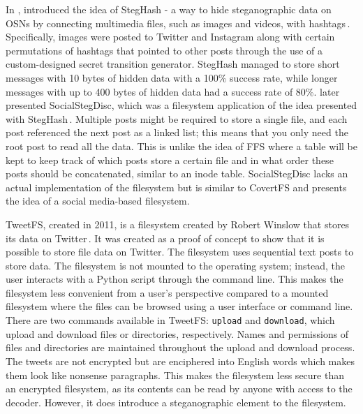 In \citeyear{szczypiorskiStegHashNewMethod2016}, \citeauthor{szczypiorskiStegHashNewMethod2016} introduced the idea of StegHash - a way to hide steganographic data on \glspl{OSN} by connecting multimedia files, such as images and videos, with hashtags\,\cite{szczypiorskiStegHashNewMethod2016}. Specifically, images were posted to Twitter and Instagram along with certain permutations of hashtags that pointed to other posts through the use of a \mbox{custom-designed} secret transition generator. StegHash managed to store short messages with 10 bytes of hidden data with a 100\% success rate, while longer messages with up to 400 bytes of hidden data had a success rate of 80\%. \citeauthor{bieniaszSocialStegDiscApplicationSteganography2017} later presented SocialStegDisc, which was a filesystem application of the idea presented with StegHash\,\cite{bieniaszSocialStegDiscApplicationSteganography2017}. Multiple posts might be required to store a single file, and each post referenced the next post as a linked list; this means that you only need the root post to read all the data. This is unlike the idea of \gls{FFS} where a table will be kept to keep track of which posts store a certain file and in what order these posts should be concatenated, similar to an inode table. SocialStegDisc lacks an actual implementation of the filesystem but is similar to CovertFS and presents the idea of a social \mbox{media-based} filesystem.

TweetFS, created in 2011, is a filesystem created by Robert Winslow that stores its data on Twitter\,\cite{winslowTweetfsTweetfsMaster}. It was created as a proof of concept to show that it is possible to store file data on Twitter. The filesystem uses sequential text posts to store data. The filesystem is not mounted to the operating system; instead, the user interacts with a Python script through the command line. This makes the filesystem less convenient from a user's perspective compared to a mounted filesystem where the files can be browsed using a user interface or command line. There are two commands available in TweetFS: \texttt{upload} and \texttt{download}, which upload and download files or directories, respectively. Names and permissions of files and directories are maintained throughout the upload and download process. The tweets are not encrypted but are enciphered into English words which makes them look like nonsense paragraphs. This makes the filesystem less secure than an encrypted filesystem, as its contents can be read by anyone with access to the decoder. However, it does introduce a steganographic element to the filesystem.

